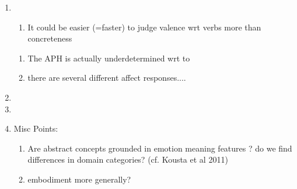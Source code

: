 \documentclass[12pt,letterpaper,table,svgnames,dvipsnames]{article}
\begin{document}
\begin{enumerate}
    




    \item {}
        
        \begin{enumerate}[noitemsep]
            \item It could be easier (=faster) to judge valence wrt verbs more than concreteness \\

        \end{enumerate}


        \begin{enumerate}
            \item The APH is actually underdetermined wrt to 
            \item there are several different affect responses....
        \end{enumerate}

   \item {}

    \item {}



    \item Misc Points:
        
        \begin{enumerate}
            \item Are abstract concepts grounded in emotion meaning features ? do we find differences in domain categories? (cf. Kousta et al 2011)

            \item embodiment more generally?
        \end{enumerate}



\end{enumerate}
\end{document}
